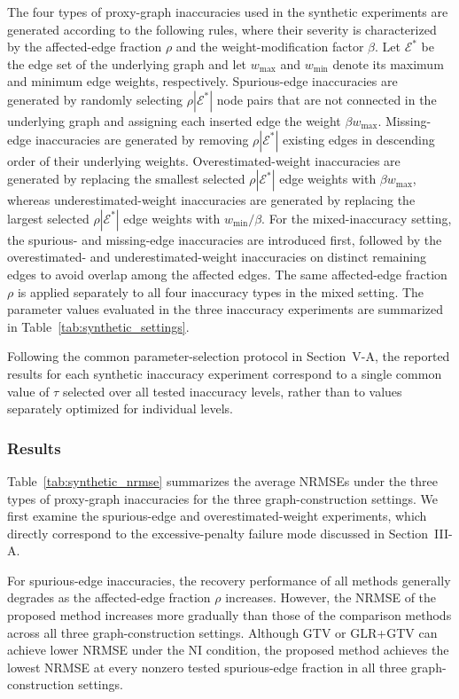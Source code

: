 The four types of proxy-graph inaccuracies used in the synthetic experiments are generated according to the following rules, where their severity is characterized by the affected-edge fraction $\rho$ and the weight-modification factor $\beta$.
Let $\mathcal{E}^{\ast}$ be the edge set of the underlying graph and let $w_{\max}$ and $w_{\min}$ denote its maximum and minimum edge weights, respectively.
Spurious-edge inaccuracies are generated by randomly selecting $\rho|\mathcal{E}^{\ast}|$ node pairs that are not connected in the underlying graph and assigning each inserted edge the weight $\beta w_{\max}$.
Missing-edge inaccuracies are generated by removing $\rho|\mathcal{E}^{\ast}|$ existing edges in descending order of their underlying weights.
Overestimated-weight inaccuracies are generated by replacing the smallest selected $\rho|\mathcal{E}^{\ast}|$ edge weights with $\beta w_{\max}$, whereas underestimated-weight inaccuracies are generated by replacing the largest selected $\rho|\mathcal{E}^{\ast}|$ edge weights with $w_{\min}/\beta$.
For the mixed-inaccuracy setting, the spurious- and missing-edge inaccuracies are introduced first, followed by the overestimated- and underestimated-weight inaccuracies on distinct remaining edges to avoid overlap among the affected edges.
The same affected-edge fraction $\rho$ is applied separately to all four inaccuracy types in the mixed setting.
The parameter values evaluated in the three inaccuracy experiments are summarized in Table~\ref{tab:synthetic_settings}.

Following the common parameter-selection protocol in Section~V-A, the reported results for each synthetic inaccuracy experiment correspond to a single common value of $\tau$ selected over all tested inaccuracy levels, rather than to values separately optimized for individual levels.

\subsubsection{Results}

Table~\ref{tab:synthetic_nrmse} summarizes the average NRMSEs under the three types of proxy-graph inaccuracies for the three graph-construction settings.
We first examine the spurious-edge and overestimated-weight experiments, which directly correspond to the excessive-penalty failure mode discussed in Section~III-A.

For spurious-edge inaccuracies, the recovery performance of all methods generally degrades as the affected-edge fraction $\rho$ increases.
However, the NRMSE of the proposed method increases more gradually than those of the comparison methods across all three graph-construction settings.
Although GTV or GLR+GTV can achieve lower NRMSE under the NI condition, the proposed method achieves the lowest NRMSE at every nonzero tested spurious-edge fraction in all three graph-construction settings.

